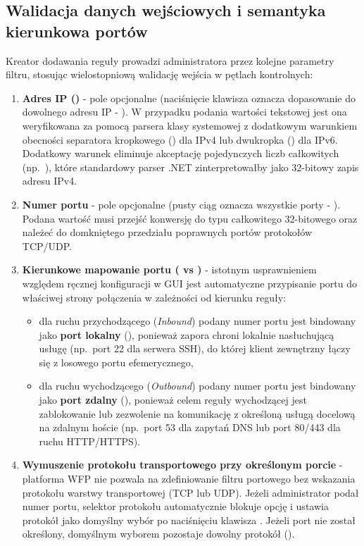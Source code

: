 \subsection{Walidacja danych wejściowych i semantyka kierunkowa portów}\label{subsec:walidacja-parametrow}

Kreator dodawania reguły prowadzi administratora przez kolejne parametry filtru, stosując wielostopniową walidację wejścia w pętlach kontrolnych:
\begin{enumerate}
    \item \textbf{Adres IP ()} - pole opcjonalne (naciśnięcie klawisza  oznacza dopasowanie do dowolnego adresu IP - ). W przypadku podania wartości tekstowej jest ona weryfikowana za pomocą parsera klasy systemowej  z dodatkowym warunkiem obecności separatora kropkowego () dla IPv4 lub dwukropka (\code{:}) dla IPv6. Dodatkowy warunek eliminuje akceptację pojedynczych liczb całkowitych (np.\ ), które standardowy parser .NET zinterpretowałby jako 32-bitowy zapis adresu IPv4.
    \item \textbf{Numer portu} - pole opcjonalne (pusty ciąg oznacza wszystkie porty - ). Podana wartość musi przejść konwersję do typu całkowitego 32-bitowego oraz należeć do domkniętego przedziału poprawnych portów protokołów TCP/UDP.
    \item \textbf{Kierunkowe mapowanie portu ( vs )} - istotnym usprawnieniem względem ręcznej konfiguracji w GUI jest automatyczne przypisanie portu do właściwej strony połączenia w zależności od kierunku reguły:
    \begin{itemize}
        \item dla ruchu przychodzącego (\textit{Inbound}) podany numer portu jest bindowany jako \textbf{port lokalny} (), ponieważ zapora chroni lokalnie nasłuchującą usługę (np.\ port 22 dla serwera SSH), do której klient zewnętrzny łączy się z losowego portu efemerycznego,
        \item dla ruchu wychodzącego (\textit{Outbound}) podany numer portu jest bindowany jako \textbf{port zdalny} (), ponieważ celem reguły wychodzącej jest zablokowanie lub zezwolenie na komunikację z określoną usługą docelową na zdalnym hoście (np.\ port 53 dla zapytań DNS lub port 80/443 dla ruchu HTTP/HTTPS).
    \end{itemize}
    \item \textbf{Wymuszenie protokołu transportowego przy określonym porcie} - platforma WFP nie pozwala na zdefiniowanie filtru portowego bez wskazania protokołu warstwy transportowej (TCP lub UDP). Jeżeli administrator podał numer portu, selektor protokołu automatycznie blokuje opcję  i ustawia protokół  jako domyślny wybór po naciśnięciu klawisza . Jeżeli port nie został określony, domyślnym wyborem pozostaje dowolny protokół ().
\end{enumerate}

